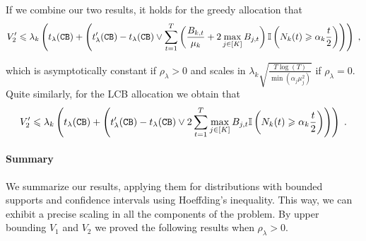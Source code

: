 If we combine our two results, it holds for the greedy allocation that
\[ V_2' \leqslant \lambda_k\left(t_\lambda(\texttt{CB}) + \left(t_\lambda'(\texttt{CB})-t_\lambda(\texttt{CB}) \vee  \sum_{t=1}^T \left(\frac{B_{k,t}}{\mu_k}+2\max_{j\in[K]}B_{j,t}\right)\mathbb{I}\left(N_k(t)\geqslant \alpha_k\frac{t}{2}\right) \right)\right) \;,   \]

which is asymptotically constant if $\rho_\lambda>0$ and scales in $\lambda_k \sqrt{\frac{T\log(T)}{\min (\alpha_j \mu_j^2 )}}$ if $\rho_\lambda=0$. Quite similarly, for the LCB allocation we obtain that
\[ V_2' \leqslant \lambda_k\left(t_\lambda(\texttt{CB}) + \left(t_\lambda'(\texttt{CB})-t_\lambda(\texttt{CB}) \vee 2\sum_{t=1}^T \max_{j\in[K]}B_{j,t}\mathbb{I}\left(N_k(t)\geqslant \alpha_k\frac{t}{2}\right) \right)\right)  \;.   \]

\paragraph{Summary} We summarize our results, applying them for distributions with bounded supports and confidence intervals using Hoeffding's inequality. This way, we can exhibit a precise scaling in all the components of the problem. By upper bounding $V_1$ and $V_2$ we proved the following results when $\rho_\lambda>0$. 


